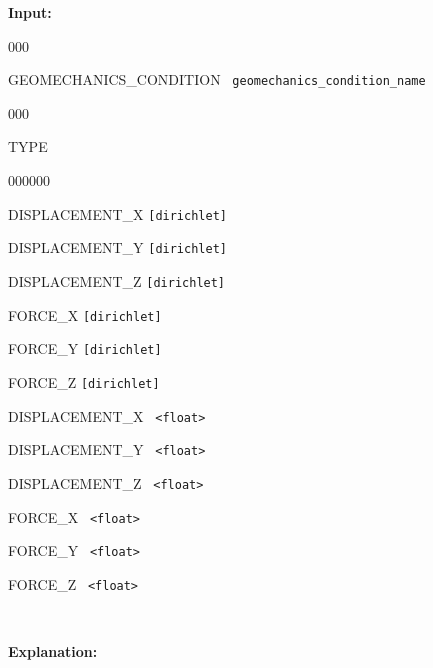 {\noindent\bf Input:}
\begin{deflist}{000}
\item [GEOMECHANICS\_CONDITION] \ {\tt geomechanics\_condition\_name}
\begin{deflist}{000}
\item[TYPE] ~

\begin{deflist}{000000}
\item[DISPLACEMENT\_X] {\tt [dirichlet]}
\item[DISPLACEMENT\_Y] {\tt [dirichlet]}
\item[DISPLACEMENT\_Z] {\tt [dirichlet]}
\item[FORCE\_X] {\tt [dirichlet]}
\item[FORCE\_Y] {\tt [dirichlet]}
\item[FORCE\_Z] {\tt [dirichlet]}
\end{deflist}
\item[\keyend]
\item[DISPLACEMENT\_X] \ {\tt <float>}
\item[DISPLACEMENT\_Y] \ {\tt <float>}
\item[DISPLACEMENT\_Z] \ {\tt <float>}
\item[FORCE\_X] \ {\tt <float>}
\item[FORCE\_Y] \ {\tt <float>}
\item[FORCE\_Z] \ {\tt <float>}
\end{deflist}
\item[\keyend] ~
\end{deflist}

{\noindent\bf Explanation:}

